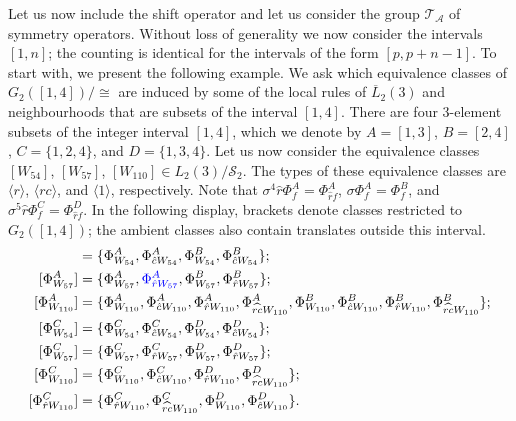 \documentclass[11pt,a4paper]{article}
\newcommand{\rev}[1]{{\color{blue}#1}}
\newenvironment{revision}{\color{blue}}{}
\newcommand{\rev}[1]{{\color{black}#1}}
\newenvironment{revision}{\color{black}}{}
\begin{document}
Let us now include the shift operator and let us consider the group $\mathcal{T}_\mathcal{A}$
of symmetry operators.
Without loss of generality we now consider the intervals $[1,n]$;
the counting is identical for the intervals of the form $[p, p+n-1]$.
To start with, we present the following example.
We ask which equivalence classes of $G_2([1,4])/{\cong}$ are induced
by some of the local rules of $\overline{L}_2(3)$ and neighbourhoods that are subsets of the interval $[1,4]$.
There are  four 3-element subsets of the integer interval $[1,4]$, which we denote by
$A=[1,3]$, $B=[2,4]$, $C=\{1,2,4\}$, and $D=\{1,3,4\}$.
Let us now consider the equivalence classes
$[W_{54}]$, $[W_{57}]$, $[W_{110}] \in L_2(3) / \mathcal{S}_2$.
The types of these equivalence classes are $\langle r \rangle$, $\langle rc \rangle$, and $\langle 1 \rangle$, respectively.
Note that $\sigma^4 \hat{r} \Phi^A_f = \Phi^A_{\hat{r}f}$, $\sigma \Phi^A_f = \Phi^B_f$, and
$\sigma^5 \hat{r} \Phi^C_f = \Phi^D_{\hat{r}f}$.
\begin{revision}
In the following display, brackets denote classes restricted to $G_2([1,4])$;
the ambient classes also contain translates outside this interval.
\end{revision}
\begin{align*}
[\Phi^{A}_{W_{54}}] & = \{ \Phi^{A}_{W_{54}}, \Phi^{A}_{\hat{c}W_{54}}, \Phi^{B}_{W_{54}},
        \Phi^{B}_{\hat{c}W_{54}} \}; \\
[\Phi^{A}_{W_{57}}] & = \{ \Phi^{A}_{W_{57}}, \rev{\Phi^{A}_{\hat{r}W_{57}}}, \Phi^{B}_{W_{57}},
        \Phi^{B}_{\hat{r}W_{57}} \}; \\
[\Phi^{A}_{W_{110}}] & = \{ \Phi^{A}_{W_{110}}, \Phi^{A}_{\hat{c}W_{110}}, \Phi^{A}_{\hat{r}W_{110}},
        \Phi^{A}_{\widehat{rc}W_{110}},
        \Phi^{B}_{W_{110}}, \Phi^{B}_{\hat{c}W_{110}}, \Phi^{B}_{\hat{r}W_{110}},
        \Phi^{B}_{\widehat{rc}W_{110}}
\}; \\
[\Phi^{C}_{W_{54}}] & = \{ \Phi^{C}_{W_{54}}, \Phi^{C}_{\hat{c}W_{54}}, \Phi^{D}_{W_{54}},
        \Phi^{D}_{\hat{c}W_{54}} \}; \\
[\Phi^{C}_{W_{57}}] & = \{ \Phi^{C}_{W_{57}}, \Phi^{C}_{\hat{r}W_{57}}, \Phi^{D}_{W_{57}},
        \Phi^{D}_{\hat{r}W_{57}} \}; \\
[\Phi^{C}_{W_{110}}] & = \{ \Phi^{C}_{W_{110}}, \Phi^{C}_{\hat{c}W_{110}}, \Phi^{D}_{\hat{r}W_{110}},
        \Phi^{D}_{\widehat{rc}W_{110}} \}; \\
[\Phi^{C}_{\hat{r}W_{110}}] & = \{ \Phi^{C}_{\hat{r}W_{110}}, \Phi^{C}_{\widehat{rc}W_{110}},
        \Phi^{D}_{W_{110}}, \Phi^{D}_{\hat{c}W_{110}} \}.
\end{align*}
\end{document}
